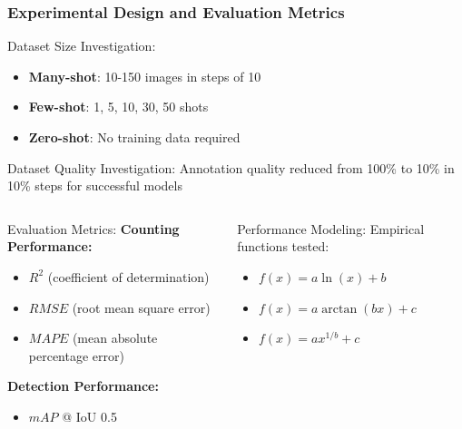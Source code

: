 \documentclass[aspectratio=43]{beamer}
\begin{document}
\begin{frame}
    \frametitle{Experimental Design and Evaluation Metrics}
    
    \begin{block}{Dataset Size Investigation:}
        \small
        \begin{itemize}
            \item \textbf{Many-shot}: 10-150 images in steps of 10
            \item \textbf{Few-shot}: 1, 5, 10, 30, 50 shots
            \item \textbf{Zero-shot}: No training data required
        \end{itemize}
    \end{block}
    
    \begin{block}{Dataset Quality Investigation:}
        \small
        Annotation quality reduced from 100\% to 10\% in 10\% steps for successful models
    \end{block}
    
    \begin{columns}
        \begin{column}{0.5\textwidth}
            \begin{exampleblock}{Evaluation Metrics:}
                \small
                \textbf{Counting Performance:}
                \begin{itemize}
                    \item $R^2$ (coefficient of determination)
                    \item $RMSE$ (root mean square error)
                    \item $MAPE$ (mean absolute percentage error)
                \end{itemize}
                
                \textbf{Detection Performance:}
                \begin{itemize}
                    \item $mAP$ @ IoU 0.5
                \end{itemize}
            \end{exampleblock}
        \end{column}
        
        \begin{column}{0.5\textwidth}
            \begin{exampleblock}{Performance Modeling:}
                \small
                Empirical functions tested:
                \begin{itemize}
                    \item $f(x) = a \ln(x) + b$
                    \item $f(x) = a \arctan(bx) + c$
                    \item $f(x) = a x^{1/b} + c$
                \end{itemize}
                

\end{exampleblock}
\end{column}
\end{columns}
\end{frame}
\end{document}

